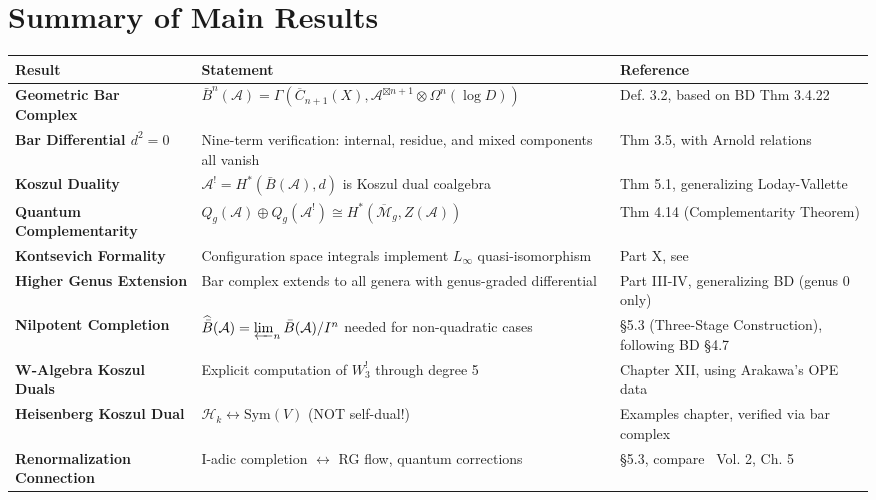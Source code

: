 \documentclass[11pt]{memoir}
\newcommand{\KonFormality}{\cite{Kontsevich99}}  %
\newcommand{\CG}{\cite{CostelloGwilliam}}        %
\newcommand{\LV}{\cite{LodayVallette}}           %
\begin{document}
\tableofcontents

\medskip


\section*{Summary of Main Results}
\begin{center}
\begin{tabular}{|p{3.5cm}|p{5cm}|p{5cm}|}
\hline
\textbf{Result} & \textbf{Statement} & \textbf{Reference} \\
\hline
\hline
\textbf{Geometric Bar Complex} & 
$\bar{B}^n(\mathcal{A}) = \Gamma(\overline{C}_{n+1}(X), \mathcal{A}^{\boxtimes n+1} \otimes \Omega^n(\log D))$ & 
Def. 3.2, based on BD Thm 3.4.22 \\
\hline
\textbf{Bar Differential $d^2=0$} & 
Nine-term verification: internal, residue, and mixed components all vanish & 
Thm 3.5, with Arnold relations \\
\hline
\textbf{Koszul Duality} & 
$\mathcal{A}^! = H^*(\bar{B}(\mathcal{A}), d)$ is Koszul dual coalgebra & 
Thm 5.1, generalizing Loday-Vallette \LV \\
\hline
\textbf{Quantum Complementarity} & 
$Q_g(\mathcal{A}) \oplus Q_g(\mathcal{A}^!) \cong H^*(\overline{\mathcal{M}}_g, Z(\mathcal{A}))$ & 
Thm 4.14 (Complementarity Theorem) \\
\hline
\textbf{Kontsevich Formality} & 
Configuration space integrals implement $L_\infty$ quasi-isomorphism & 
Part X, see \KonFormality \\
\hline
\textbf{Higher Genus Extension} & 
Bar complex extends to all genera with genus-graded differential & 
Part III-IV, generalizing BD (genus 0 only) \\
\hline
\textbf{Nilpotent Completion} & 
$\widehat{\bar{B}}(\mathcal{A}) = \varprojlim_n \bar{B}(\mathcal{A})/I^n$ needed for non-quadratic cases & 
\S5.3 (Three-Stage Construction), following BD \S4.7 \\
\hline
\textbf{W-Algebra Koszul Duals} & 
Explicit computation of $W_3^!$ through degree 5 & 
Chapter XII, using Arakawa's OPE data \\
\hline
\textbf{Heisenberg Koszul Dual} & 
$\mathcal{H}_k \leftrightarrow \text{Sym}(V)$ (NOT self-dual!) & 
Examples chapter, verified via bar complex \\
\hline
\textbf{Renormalization Connection} & 
I-adic completion $\leftrightarrow$ RG flow, quantum corrections & 
\S5.3, compare \CG~Vol. 2, Ch. 5 \\
\hline
\end{tabular}
\end{center}
\end{document}
